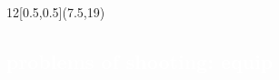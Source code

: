 \begin{frame}
\cleardoublepage
\pagecolor{black}

\begin{textblock}{12}[0.5,0.5](7.5,19)
    \textcolor{white}{
    \part[Equip]{problems of shooting: equip}
    \label{equip}
	}
\end{textblock}

\end{frame}




